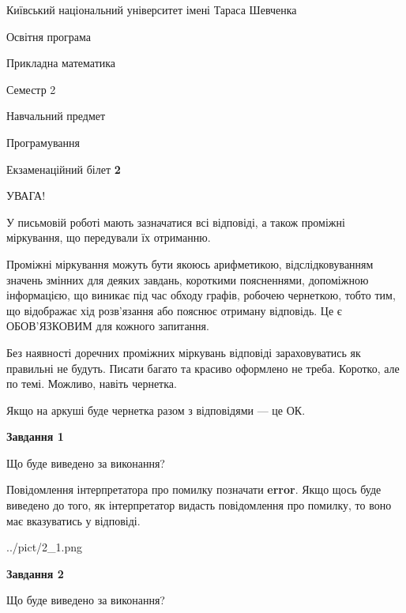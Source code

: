 \documentclass[12pt, ukrainian]{article}
\begin{document}
{{\begin {small}\par
{ \center  Київський національний університет імені Тараса Шевченка \par}
{\parbox {5 cm}{Освітня програма \hfill}{\parbox {7 cm}{Прикладна математика \hfill}}\parbox {6 cm}{\hfill Семестр 2}}\par
{\parbox {5 cm} {Навчальний предмет \hfill}\parbox {7 cm}{Програмування \hfill}\parbox {6cm}{\hfill}\par}\vspace{-7pt} \end{small}}{\center Екзаменаційний білет \No \textbf
{ 2 }\par}}
{
\begin {large}
УВАГА!

У письмовій роботі мають зазначатися всі відповіді, а також проміжні міркування, що передували їх отриманню.

Проміжні міркування можуть бути якоюсь арифметикою, відслідковуванням зна\-чень змінних для деяких завдань,
короткими поясненнями, допоміжною інформацією, що виникає під час обходу графів, робочею чернеткою,
тобто тим, що відображає хід розв’язання або пояснює отриману відповідь.
Це є ОБОВ’ЯЗКОВИМ для кожного запитання.

Без наявності доречних проміжних міркувань відповіді зараховуватись як правиль\-ні не будуть.
Писати багато та красиво оформлено не треба. Коротко, але по темі. Можли\-во, навіть чернетка.

Якщо на аркуші буде чернетка разом з відповідями --- це ОК.

\newpage

{\begin {center}\textbf{Завдання 1}\end {center}}\par
Що буде виведено за виконання?

Повідомлення інтерпретатора про помилку позначати \textbf{error}.
Якщо щось буде виведено до того, як інтерпретатор видасть повідомлення про помилку, 
то воно має вказуватись у відповіді. \par


\begin{center}
	{../pict/2_1.png}
\end{center}
\newpage

{\begin {center}\textbf{Завдання 2}\end {center}}\par
Що буде виведено за виконання?


\end{large}}
\end{document}
